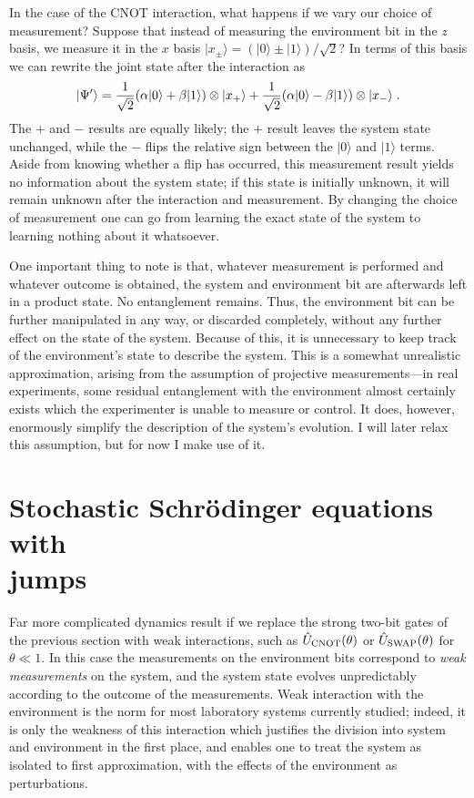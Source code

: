 \documentclass[12pt]{article}
\def\ket#1{{| #1 \rangle}}
\def\U{{\hat U}}
\begin{document}
In the case of the CNOT interaction, what happens if we vary our choice of
measurement?  Suppose that instead of measuring the environment bit in
the $z$ basis, we measure it in the $x$ basis
$\ket{x_\pm} = (\ket0 \pm \ket1)/\sqrt{2}$?  In terms of this basis we can
rewrite the joint state after the interaction as
\begin{equation}
\ket{\Psi'} = {1\over\sqrt2} (\alpha\ket0 + \beta\ket1)\otimes\ket{x_+}
  + {1\over\sqrt2} (\alpha\ket0 - \beta\ket1)\otimes\ket{x_-} \;.
\end{equation}
The $+$ and $-$ results are equally likely; the $+$ result leaves the
system state unchanged, while the $-$ flips the relative sign between the
$\ket0$ and $\ket1$ terms.  Aside from knowing whether a flip has occurred,
this measurement result yields no information about the system state;
if this state is initially unknown, it will remain unknown after the
interaction and measurement.  By changing the choice of measurement one
can go from learning the exact state of the system to learning nothing
about it whatsoever.

One important thing to note is that, whatever measurement is performed and
whatever outcome is obtained, the system and environment bit are afterwards
left in a product state.  No entanglement remains.  Thus, the environment
bit can be further manipulated in any way, or discarded completely, without
any further effect on the state of the system.  Because of this, it is
unnecessary to keep track of the environment's state to describe
the system.  This is a somewhat unrealistic approximation,
arising from the assumption of projective measurements---in
real experiments, some residual entanglement with the environment almost
certainly exists which the experimenter is unable to measure or control.  It
does, however, enormously simplify the description of the system's evolution.
I will later relax this assumption, but for now I make use of it.


\section{Stochastic Schr\"odinger equations with \\ jumps}

Far more complicated dynamics result if we replace the strong two-bit
gates of the previous section with weak interactions, such as
$\U_{\rm CNOT}(\theta)$ or $\U_{\rm SWAP}(\theta)$ for $\theta \ll 1$.
In this case the measurements on the environment bits correspond to
{\it weak measurements} on the system, and the system state evolves
unpredictably according to the outcome of the measurements.
Weak interaction with the environment is the norm for most laboratory
systems currently studied; indeed, it is only the weakness of this
interaction which justifies the division into system and environment
in the first place, and enables one to treat the system as isolated to
first approximation, with the effects of the environment as
perturbations.
\end{document}

